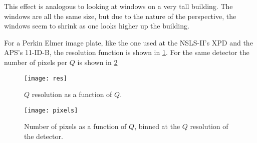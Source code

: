 This effect is analogous to looking at windows on a very tall building.
The windows are all the same size, but due to the nature of the perspective, the windows seem to shrink as one looks higher up the building.


For a Perkin Elmer image plate, like the one used at the NSLS-II's XPD and the APS's 11-ID-B, the resolution function is shown in \ref{fig:res_func}.
For the same detector the number of pixels per $Q$ is shown in \ref{fig:pixel_hist}
\begin{figure}[!ht]
  \texttt{[image: res]}
\caption{$Q$ resolution as a function of $Q$.}
\label{fig:res_func}
\end{figure}

\begin{figure}[!ht]
  \texttt{[image: pixels]}
\caption{Number of pixels as a function of $Q$, binned at the $Q$ resolution of the detector.}
\label{fig:pixel_hist}
\end{figure}
